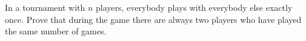 In a tournament with $n$ players, everybody plays with everybody else exactly once. Prove that during the game there are always two players who have played the same number of games.

